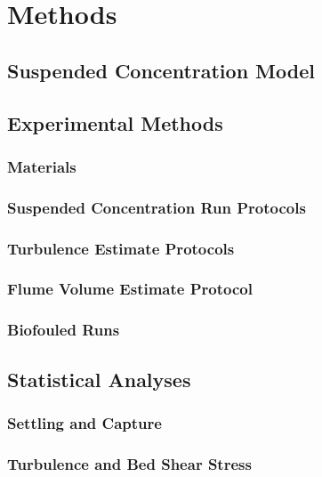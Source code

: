 \documentclass{article}
\begin{document}
\section{Methods}

\subsection{Suspended Concentration Model}

\subsection{Experimental Methods}

\subsubsection{Materials}

\subsubsection{Suspended Concentration Run Protocols}

\subsubsection{Turbulence Estimate Protocols}

\subsubsection{Flume Volume Estimate Protocol}

\subsubsection{Biofouled Runs}

\subsection{Statistical Analyses}

\subsubsection{Settling and Capture}

\subsubsection{Turbulence and Bed Shear Stress}
\end{document}
